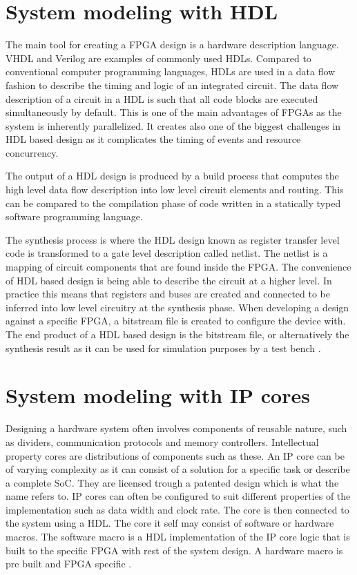\documentclass[12pt]{report}
\begin{document}
\section{System modeling with HDL}
The main tool for creating a FPGA design is a hardware description language. VHDL and Verilog are examples of commonly used HDLs. Compared to conventional computer programming languages, HDLs are used in a data flow fashion to describe the timing and logic of an integrated circuit. The data flow description of a circuit in a HDL is such that all code blocks are executed simultaneously by default. This is one of the main advantages of FPGAs as the system is inherently parallelized. It creates also one of the biggest challenges in HDL based design as it complicates the timing of events and resource concurrency.
\par
The output of a HDL design is produced by a build process that computes the high level data flow description into low level circuit elements and routing. This can be compared to the compilation phase of code written in a statically typed software programming language. 
\par
The synthesis process is where the HDL design known as register transfer level code is transformed to a gate level description called netlist. The netlist is a mapping of circuit components that are found inside the FPGA. The convenience of HDL based design is being able to describe the circuit at a higher level. In practice this means that registers and buses are created and connected to be inferred into low level circuitry at the synthesis phase. When developing a design against a specific FPGA, a bitstream file is created to configure the device with. The end product of a HDL based design is the bitstream file, or alternatively the synthesis result as it can be used for simulation purposes by a test bench \citep{XilVivado}.

\section{System modeling with IP cores}
Designing a hardware system often involves components of reusable nature, such as dividers, communication protocols and memory controllers. Intellectual property cores are distributions of components such as these. An IP core can be of varying complexity as it can consist of a solution for a specific task or describe a complete SoC. They are licensed trough a patented design which is what the name refers to. IP cores can often be configured to suit different properties of the implementation such as data width and clock rate. The core is then connected to the system using a HDL. The core it self may consist of software or hardware macros. The software macro is a HDL implementation of the IP core logic that is built to the specific FPGA with rest of the system design. A hardware macro is pre built and FPGA specific \citep{EERefBook} \citep{XilVivado}.
\end{document}
